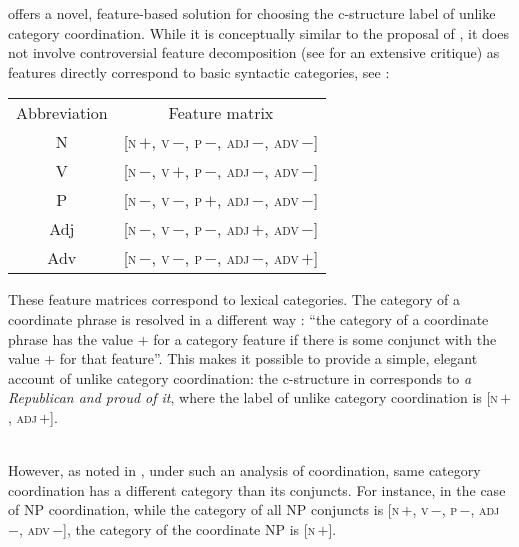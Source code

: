 \documentclass[output=paper]{../langscibook}
\begin{document}
\citet{dalr:17} offers a novel, feature-based solution for choosing
the c-structure label of unlike category coordination. While it is
conceptually similar to the proposal of \citet{sag:etal:85}, it does
not involve controversial feature decomposition (see \citet{baye:96}
for an extensive critique) as features directly correspond to basic
syntactic categories, see :
\ea\label{ex:dalr:17:43}
    \begin{tabular}[t]{cc}
      Abbreviation & Feature matrix \\
      N & [\textsc{n}\,$+$, \textsc{v}\,$-$, \textsc{p}\,$-$, \textsc{adj}\,$-$, \textsc{adv}\,$-$] \\
      V & [\textsc{n}\,$-$, \textsc{v}\,$+$, \textsc{p}\,$-$, \textsc{adj}\,$-$, \textsc{adv}\,$-$] \\
      P & [\textsc{n}\,$-$, \textsc{v}\,$-$, \textsc{p}\,$+$, \textsc{adj}\,$-$, \textsc{adv}\,$-$] \\
      Adj & [\textsc{n}\,$-$, \textsc{v}\,$-$, \textsc{p}\,$-$, \textsc{adj}\,$+$, \textsc{adv}\,$-$] \\
      Adv & [\textsc{n}\,$-$, \textsc{v}\,$-$, \textsc{p}\,$-$, \textsc{adj}\,$-$, \textsc{adv}\,$+$] \\
    \end{tabular}\hfill\citep[(43)]{dalr:17}
\z
These feature matrices correspond to lexical categories. The category
of a coordinate phrase is resolved in a different way \citep[48]{dalr:17}: ``the category
of a coordinate phrase has the value $+$ for a category feature if
there is some conjunct with the value $+$ for that feature''. This
makes it possible to provide a simple, elegant account of unlike
category coordination: the c-structure in  corresponds
to \emph{a Republican and proud of it},
where the label of unlike category coordination is
[\textsc{n}\,$+$, \textsc{adj}\,$+$].
\ea\label{ex:coordcat}
\\ \hspace*{\fill} \citep[(5)]{PP2021}
\z
However, as noted in \citet[208, fn. 4]{PP2021}, under such
an analysis of coordination, same category coordination has a
different category than its conjuncts. For instance, in the case of NP
coordination, while the category of all NP conjuncts is
[\textsc{n}\,$+$, \textsc{v}\,$-$, \textsc{p}\,$-$, \textsc{adj}\,$-$,
  \textsc{adv}\,$-$], the category of the coordinate NP is
[\textsc{n}\,$+$].
\end{document}
